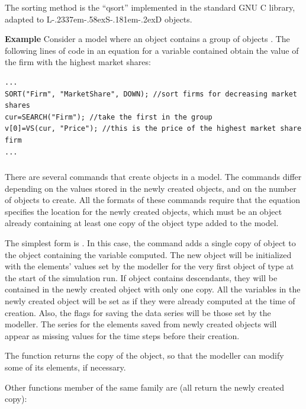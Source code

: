 \documentclass [11pt,a4paper] {book}
\def\LsD{{L\kern-.2337em\lower-.58ex\hbox{S}\kern-.181em\lower-.2ex\hbox{D}}\xspace}
\begin{document}
The sorting method is the ``qsort'' implemented in the standard GNU C library, adapted to \LsD objects.

\textbf{Example} Consider a model where an object  contains a group of
objects . The following lines of code in an equation for a variable contained
 obtain the  value of the firm with the highest market shares:
 \small
\begin{verbatim}
...
SORT("Firm", "MarketShare", DOWN); //sort firms for decreasing market shares
cur=SEARCH("Firm"); //take the first in the group
v[0]=VS(cur, "Price"); //this is the price of the highest market share firm
...
\end{verbatim}
\normalsize



\subsubsection{ }
There are several commands that create objects in a model. The commands differ depending on the values stored in the newly created objects, and on the number of objects to create. All the formats of these commands require that the equation specifies the location for the newly created objects, which must be an object already containing at least one copy of the object type added to the model.

The simplest form is . In this case, the command adds a single copy of object  to the object containing the variable computed. The new object will be initialized with the elements' values set by the modeller for the very first object of type  at the start of the simulation run. If object  contains descendants, they will be contained in the newly created object with only one copy. All the variables in the newly created object will be set as if they were already computed at the time of creation. Also, the flags for saving the data series will be those set by the modeller. The series for the elements saved from newly created objects will appear as missing values for the time steps before their creation.


The function returns the copy of the object, so that the modeller can modify some of its elements, if necessary.


Other functions member of the same family are (all return the newly created copy):
\end{document}
